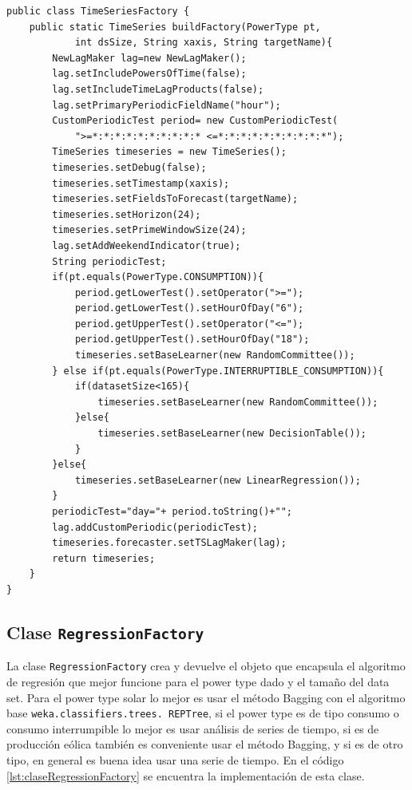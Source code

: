 \begin{lstlisting}[frame=single]  
public class TimeSeriesFactory {
	public static TimeSeries buildFactory(PowerType pt, 
			int dsSize, String xaxis, String targetName){
		NewLagMaker lag=new NewLagMaker();
		lag.setIncludePowersOfTime(false);
		lag.setIncludeTimeLagProducts(false);
		lag.setPrimaryPeriodicFieldName("hour"); 
		CustomPeriodicTest period= new CustomPeriodicTest(
			">=*:*:*:*:*:*:*:*:*:* <=*:*:*:*:*:*:*:*:*:*");
		TimeSeries timeseries = new TimeSeries();
		timeseries.setDebug(false);
		timeseries.setTimestamp(xaxis);
		timeseries.setFieldsToForecast(targetName);
        timeseries.setHorizon(24);
        timeseries.setPrimeWindowSize(24);
        lag.setAddWeekendIndicator(true);
        String periodicTest;
		if(pt.equals(PowerType.CONSUMPTION)){
			period.getLowerTest().setOperator(">=");
			period.getLowerTest().setHourOfDay("6");
			period.getUpperTest().setOperator("<=");
			period.getUpperTest().setHourOfDay("18");
	        timeseries.setBaseLearner(new RandomCommittee());
		} else if(pt.equals(PowerType.INTERRUPTIBLE_CONSUMPTION)){
			if(datasetSize<165){
				timeseries.setBaseLearner(new RandomCommittee());
			}else{
				timeseries.setBaseLearner(new DecisionTable());
			}
		}else{
			timeseries.setBaseLearner(new LinearRegression());
		}
		periodicTest="day="+ period.toString()+"";
		lag.addCustomPeriodic(periodicTest);
		timeseries.forecaster.setTSLagMaker(lag);
		return timeseries;
	}
}

\end{lstlisting}

\clearpage 
\subsection{Clase \texttt{RegressionFactory}} \label{subsec:claseRegressionFactory}
La clase \texttt{RegressionFactory} crea y devuelve el objeto que encapsula el algoritmo de regresión que mejor funcione para el power type dado y el tamaño del data set. Para el power type solar lo mejor es usar el método Bagging con el algoritmo base \texttt{weka.classifiers.trees. REPTree}, si el power type es de tipo consumo o consumo interrumpible lo mejor es usar análisis de series de tiempo, si es de producción eólica también es conveniente usar el método Bagging, y si es de otro tipo, en general es buena idea usar una serie de tiempo.
En el código \ref{lst:claseRegressionFactory} se encuentra la implementación de esta clase.


